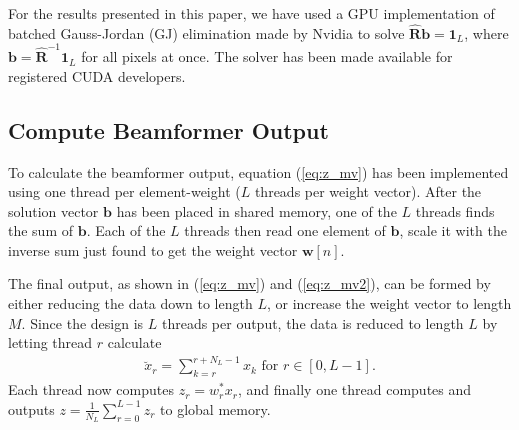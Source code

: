 \documentclass[12pt,journal,onecolumn]{IEEEtran}
\newcommand{\mat}[1]{\mathbf{#1}}
\renewcommand{\vec}[1]{\mathbf{#1}}
\begin{document}
For the results presented in this paper, we have used a GPU implementation of batched Gauss-Jordan (GJ) elimination made by Nvidia to solve $\mat{\hat{R}}\vec{b} = \vec{1}_L$, where $\vec{b} = \mat{\hat{R}}^{-1}\vec{1}_L$ for all pixels at once. The solver has been made available for registered CUDA developers.%





\subsection{Compute Beamformer Output}
To calculate the beamformer output, equation (\ref{eq:z_mv}) has been implemented using one thread per element-weight ($L$ threads per weight vector). After the solution vector $\vec{b}$ has been placed in shared memory, one of the $L$ threads finds the sum of $\vec{b}$. 
Each of the $L$ threads then read one element of $\vec{b}$, scale it with the inverse sum just found to get the weight vector $\vec{w}[n]$. 

The final output, as shown in (\ref{eq:z_mv}) and (\ref{eq:z_mv2}), can be formed by either reducing the data down to length $L$, or increase the weight vector to length $M$. Since the design is $L$ threads per output, the data is reduced to length $L$ by letting thread $r$ calculate 
\begin{align}\label{eq:subsum}
\breve{x}_{r} = \sum_{k=r}^{r+N_L-1}x_{k} \text{ for } r \in [0, L-1].
\end{align}
Each thread now computes $z_r = w_r^*x_r$, and finally one thread computes and outputs $z = \frac{1}{N_L}\sum_{r=0}^{L-1} z_r$ to global memory. %
\end{document}
